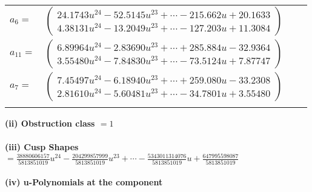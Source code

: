 \documentclass[1p]{elsarticle_modified}
\theoremstyle{definition}
\begin{document}
\begin{tabular}{m{7pt} m{180pt} m{7pt} m{180pt} }
\flushright $a_{6}=$&$\begin{pmatrix}24.1743 u^{24}-52.5145 u^{23}+\cdots-215.662 u+20.1633\\4.38131 u^{24}-13.2049 u^{23}+\cdots-127.203 u+11.3084\end{pmatrix}$ \\
\flushright $a_{11}=$&$\begin{pmatrix}6.89964 u^{24}-2.83690 u^{23}+\cdots+285.884 u-32.9364\\3.55480 u^{24}-7.84830 u^{23}+\cdots-73.5124 u+7.87747\end{pmatrix}$ \\
\flushright $a_{7}=$&$\begin{pmatrix}7.45497 u^{24}-6.18940 u^{23}+\cdots+259.080 u-33.2308\\2.81610 u^{24}-5.60481 u^{23}+\cdots-34.7801 u+3.55480\end{pmatrix}$\\&\end{tabular}
\flushleft \textbf{(ii) Obstruction class $= 1$}\\~\\
\flushleft \textbf{(iii) Cusp Shapes $= \frac{38880606157}{5813851019} u^{24}-\frac{204299857999}{5813851019} u^{23}+\cdots-\frac{5343011314076}{5813851019} u+\frac{647995598087}{5813851019}$}\\~\\
\newpage\renewcommand{\arraystretch}{1}
\flushleft \textbf{(iv) u-Polynomials at the component}\newline \\
\end{document}
